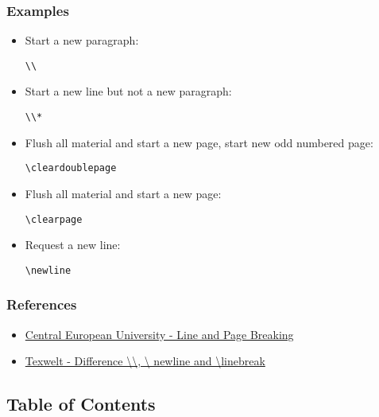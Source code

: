 \subsubsection{Examples}
\begin{itemize}
\item{Start a new paragraph:
\begin{lstlisting}[style=cstm-lists-latex-oneline-sty]
\\
\end{lstlisting}
}
\item{Start a new line but not a new paragraph:
\begin{lstlisting}[style=cstm-lists-latex-oneline-sty]
\\*
\end{lstlisting}
}
\item{Flush all material and start a new page, start new odd numbered page:
\begin{lstlisting}[style=cstm-lists-latex-oneline-sty]
\cleardoublepage
\end{lstlisting}
}
\item{Flush all material and start a new page:
\begin{lstlisting}[style=cstm-lists-latex-oneline-sty,label=test,caption=xyztest]
\clearpage
\end{lstlisting}
}
\item{Request a new line:
\begin{lstlisting}[style=cstm-lists-latex-oneline-sty]
\newline
\end{lstlisting}
}
\end{itemize}
\subsubsection{References}
\begin{itemize}
    \item{\href{http://www.personal.ceu.hu/tex/breaking.htm}
        {Central European University - Line and Page Breaking} \autocite{CEU01}}
    \item{\href{https://texwelt.de/wissen/fragen/4014/was-ist-der-unterschied-zwischen-newline-und-linebreak}
        {Texwelt - Difference \textbackslash \textbackslash, \textbackslash
        newline and \textbackslash linebreak} \autocite{TEXWELT01}}
\end{itemize}


\subsection{Table of Contents}

